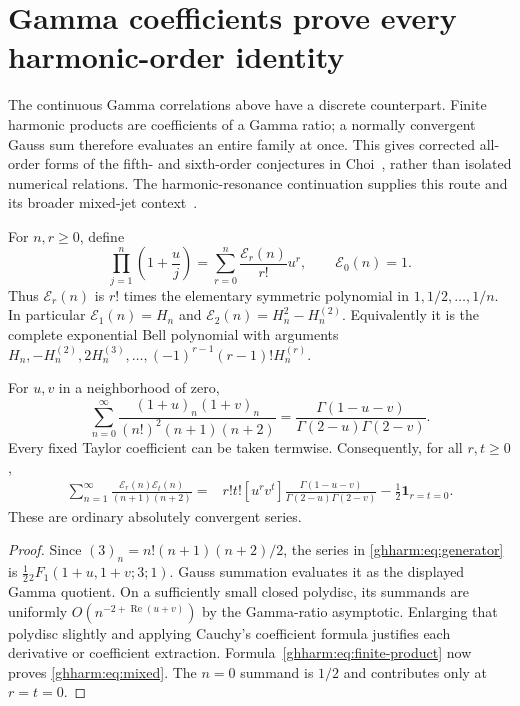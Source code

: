 \section{Gamma coefficients prove every harmonic-order identity}
\label{ghharm:sec:main}
The continuous Gamma correlations above have a discrete counterpart.
Finite harmonic products are coefficients of a Gamma ratio; a normally
convergent Gauss sum therefore evaluates an entire family at once.
This gives corrected all-order forms of the fifth- and sixth-order
conjectures in Choi~\cite{ghharm:Choi}, rather than isolated numerical
relations. The harmonic-resonance continuation supplies this route and
its broader mixed-jet context~\cite{ghharm:report}.

For $n,r\ge0$, define
\begin{equation}\label{ghharm:eq:finite-product}
 \prod_{j=1}^n\left(1+\frac uj\right)
   =\sum_{r=0}^n\frac{\mathcal E_r(n)}{r!}u^r,
 \qquad \mathcal E_0(n)=1.
\end{equation}
Thus $\mathcal E_r(n)$ is $r!$ times the elementary symmetric
polynomial in $1,1/2,\ldots,1/n$. In particular
$\mathcal E_1(n)=H_n$ and
$\mathcal E_2(n)=H_n^2-H_n^{(2)}$. Equivalently it is the complete
exponential Bell polynomial with arguments
$H_n,-H_n^{(2)},2H_n^{(3)},\ldots,
(-1)^{r-1}(r-1)!H_n^{(r)}$.

\begin{theorem}
\label{ghharm:thm:generator}
For $u,v$ in a neighborhood of zero,
\begin{equation}\label{ghharm:eq:generator}
 \sum_{n=0}^{\infty}
 \frac{(1+u)_n(1+v)_n}{(n!)^2(n+1)(n+2)}
 =\frac{\Gamma(1-u-v)}{\Gamma(2-u)\Gamma(2-v)}.
\end{equation}
Every fixed Taylor coefficient can be taken termwise. Consequently,
for all $r,t\ge0$,
\begin{align}\label{ghharm:eq:mixed}
 \sum_{n=1}^{\infty}
 \frac{\mathcal E_r(n)\mathcal E_t(n)}{(n+1)(n+2)}
 ={}&r!t![u^rv^t]
       \frac{\Gamma(1-u-v)}{\Gamma(2-u)\Gamma(2-v)}
       -\frac12\mathbf1_{r=t=0}.
\end{align}
These are ordinary absolutely convergent series.
\end{theorem}
\begin{proof}
Since $(3)_n=n!(n+1)(n+2)/2$, the series in
\eqref{ghharm:eq:generator} is
$\tfrac12{}_2F_1(1+u,1+v;3;1)$. Gauss summation
\cite{ghharm:Gauss} evaluates it as the displayed Gamma quotient.
On a sufficiently small closed polydisc, its summands are uniformly
$O(n^{-2+\operatorname{Re}(u+v)})$ by the Gamma-ratio asymptotic.
Enlarging that polydisc slightly and applying Cauchy's coefficient
formula justifies each derivative or coefficient extraction.
Formula~\eqref{ghharm:eq:finite-product} now proves
\eqref{ghharm:eq:mixed}. The $n=0$ summand is $1/2$ and contributes
only at $r=t=0$.
\end{proof}


